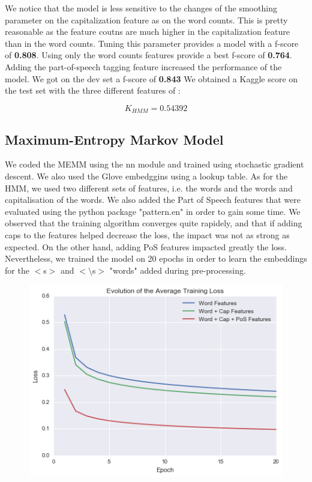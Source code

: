 \documentclass[11pt]{article}
\begin{document}
We notice that the model is less sensitive to the changes of the smoothing parameter on the capitalization feature as on the word counts. This is pretty reasonable as the feature coutns are much higher in the capitalization feature than in the word counts. Tuning this parameter provides a model with a f-score of \textbf{0.808}. Using only the word counts features provide a best f-score of \textbf{0.764}.\\

Adding the part-of-speech tagging feature increased the performance of the model. We got on the dev set a f-score of \textbf{0.843}
We obtained a Kaggle score on the test set with the three different features of :

$$K_{HMM} = 0.54392$$

\subsection{Maximum-Entropy Markov Model}

We coded the MEMM using the nn module and trained using stochastic gradient descent. We also used the Glove embedggins using a lookup table. As for the HMM, we used two different sets of features, i.e. the words and the words and capitalisation of the words. We also added the Part of Speech features that were evaluated using the python package "pattern.en" in order to gain some time. We observed that the training algorithm converges quite rapidely, and that if adding caps to the features helped decrease the loss, the impact was not as strong as expected. On the other hand, adding PoS features impacted greatly the loss. Nevertheless, we trained the model on 20 epochs in order to learn the embeddings for the $<$s$>$ and $<\setminus$s$>$ "words" added during pre-processing.

\begin{figure}[H]
\centering
\includegraphics[width=0.6\linewidth]{loss_mem}
\end{figure}
\end{document}

